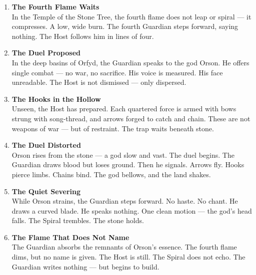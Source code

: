 \documentclass[9pt]{article}
\begin{document}
\begin{center}
\begin{enumerate}
    \item \textbf{The Fourth Flame Waits} \\
    In the Temple of the Stone Tree, the fourth flame does not leap or spiral — it compresses. A low, wide burn. The fourth Guardian steps forward, saying nothing. The Host follows him in lines of four.

    \vspace{.3in}
    \item \textbf{The Duel Proposed} \\
    In the deep basins of Orfyd, the Guardian speaks to the god Orson. He offers single combat — no war, no sacrifice. His voice is measured. His face unreadable. The Host is not dismissed — only dispersed.

    \vspace{.3in}
    \item \textbf{The Hooks in the Hollow} \\
    Unseen, the Host has prepared. Each quartered force is armed with bows strung with song-thread, and arrows forged to catch and chain. These are not weapons of war — but of restraint. The trap waits beneath stone.

    \vspace{.3in}
    \item \textbf{The Duel Distorted} \\
    Orson rises from the stone — a god slow and vast. The duel begins. The Guardian draws blood but loses ground. Then he signals. Arrows fly. Hooks pierce limbs. Chains bind. The god bellows, and the land shakes.

    \vspace{.3in}
    \item \textbf{The Quiet Severing} \\
    While Orson strains, the Guardian steps forward. No haste. No chant. He draws a curved blade. He speaks nothing. One clean motion — the god’s head falls. The Spiral trembles. The stone holds.

    \vspace{.3in}
    \item \textbf{The Flame That Does Not Name} \\
    The Guardian absorbs the remnants of Orson’s essence. The fourth flame dims, but no name is given. The Host is still. The Spiral does not echo. The Guardian writes nothing — but begins to build.
\end{enumerate}
\end{center}
\end{document}
